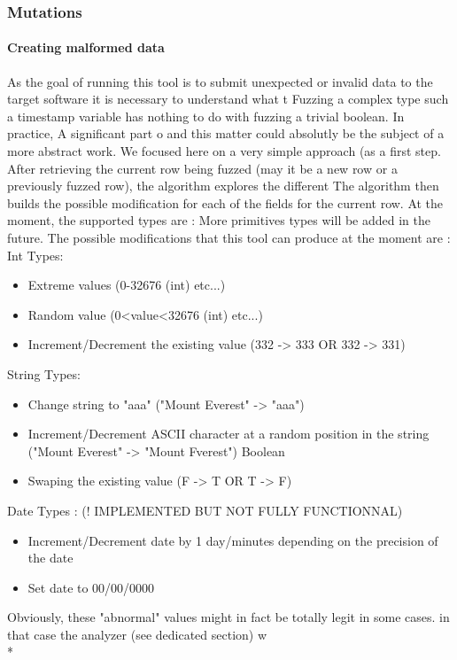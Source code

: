 \documentclass{article}
\begin{document}
  				
			\subsubsection{Mutations}
				\paragraph{Creating malformed data} 
As the goal of running this tool is to submit unexpected or invalid data to the target software it is necessary to understand what t
Fuzzing a complex type such a timestamp variable has nothing to do with fuzzing a trivial boolean. In practice, A significant part o
and this matter could absolutly be the subject of a more abstract work. We focused here on a very simple approach (as a first step.
After retrieving the current row being fuzzed (may it be a new row or a previously fuzzed row), the algorithm explores the different
The algorithm then builds the possible modification for each of the fields for the current row.
At the moment, the supported types are : %
More primitives types will be added in the future.
The possible modifications that this tool can produce at the moment are : %
				Int Types:
				\begin{itemize}
		
					\item Extreme values (0-32676 (int) etc...)
					\item Random value (0<value<32676 (int) etc...)
					\item Increment/Decrement the existing value (332 -> 333 OR 332 -> 331)
				\end{itemize}
				String Types:
				\begin{itemize}
			
					\item Change string to "aaa" ("Mount Everest" -> "aaa")
					\item Increment/Decrement ASCII character at a random position in the string ("Mount Everest" -> "Mount Fverest")
					Boolean
					\item Swaping the existing value (F -> T OR T -> F)
					\end{itemize}
					Date Types : (! IMPLEMENTED BUT NOT FULLY FUNCTIONNAL)					
					\begin{itemize}
					\item Increment/Decrement date by 1 day/minutes depending on the precision of the date
					\item Set date to 00/00/0000
				\end{itemize}
Obviously, these "abnormal" values might in fact be totally legit in some cases. in that case the analyzer (see dedicated section) w
				\\*
\end{document}
